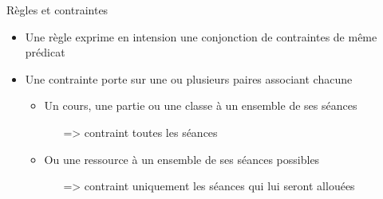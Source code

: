 \documentclass{beamer}
\begin{document}
\begin{frame}{Règles et contraintes}

 
 \vspace{0.5cm}
 \begin{itemize}
     \item Une règle exprime en intension une conjonction de contraintes de même prédicat
     \item Une contrainte porte sur une ou plusieurs paires associant chacune
        \begin{itemize}
        \item Un cours, une partie ou une classe à un ensemble de ses séances
            \begin{itemize}
            \item[=>] contraint toutes les séances
            \end{itemize}
        \item Ou une ressource à un ensemble de ses séances possibles
            \begin{itemize}
            \item[=>] contraint uniquement les séances qui lui seront allouées
            \end{itemize}
        \end{itemize}     
     

\end{itemize}
\end{frame}
\end{document}
